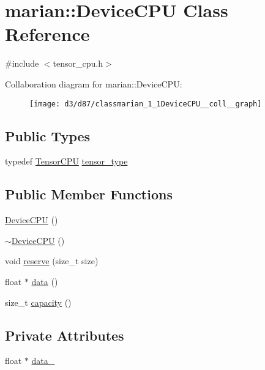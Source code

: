 \hypertarget{classmarian_1_1DeviceCPU}{}\section{marian\+:\+:Device\+C\+PU Class Reference}
\label{classmarian_1_1DeviceCPU}


{\ttfamily \#include $<$tensor\+\_\+cpu.\+h$>$}



Collaboration diagram for marian\+:\+:Device\+C\+PU\+:
\nopagebreak
\begin{figure}[H]
\begin{center}
\leavevmode
\texttt{[image: d3/d87/classmarian\_1\_1DeviceCPU\_\_coll\_\_graph]}
\end{center}
\end{figure}
\subsection*{Public Types}
\begin{DoxyCompactItemize}
\item 
typedef \hyperlink{classmarian_1_1TensorCPU}{Tensor\+C\+PU} \hyperlink{classmarian_1_1DeviceCPU_a16eb33ef98e4cdebd241da1c0c8c6f8f}{tensor\+\_\+type}
\end{DoxyCompactItemize}
\subsection*{Public Member Functions}
\begin{DoxyCompactItemize}
\item 
\hyperlink{classmarian_1_1DeviceCPU_a68536c49befa3793d58ad903b8ffa44c}{Device\+C\+PU} ()
\item 
\hyperlink{classmarian_1_1DeviceCPU_a1f1e574e3137a56653fdacafd6a5a8ba}{$\sim$\+Device\+C\+PU} ()
\item 
void \hyperlink{classmarian_1_1DeviceCPU_abdcf01c5e5c8e4aa89f8a16fc6c357e6}{reserve} (size\+\_\+t size)
\item 
float $\ast$ \hyperlink{classmarian_1_1DeviceCPU_a2a0078ab9d4e01573828ff9ce55bba06}{data} ()
\item 
size\+\_\+t \hyperlink{classmarian_1_1DeviceCPU_af3a127e8b95a28a67d647eb75701c31a}{capacity} ()
\end{DoxyCompactItemize}
\subsection*{Private Attributes}
\begin{DoxyCompactItemize}
\item 
float $\ast$ \hyperlink{classmarian_1_1DeviceCPU_ab572019008e518a425622428fe384501}{data\+\_\+}
\end{DoxyCompactItemize}


